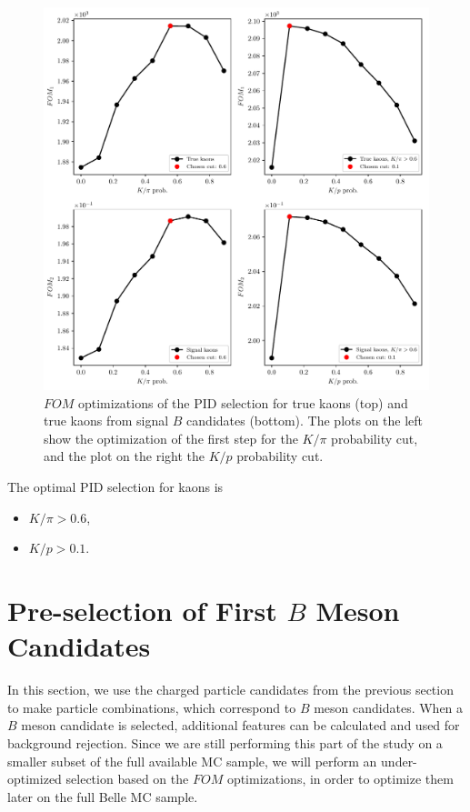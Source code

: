 \begin{figure}[H]
	\centering
	\captionsetup{width=.8\linewidth}
	\includegraphics[width=\linewidth]{fig/FSP_kaon_fom}
	\caption{$FOM$ optimizations of the PID selection for true kaons (top) and true kaons from signal $B$ candidates (bottom). The plots on the left show the optimization of the first step for the $K / \pi$ probability cut, and the plot on the right the $K/p$ probability cut.}
	\label{fig:Kfom}
\end{figure}

The optimal PID selection for kaons is
\begin{itemize}
	\item $K/\pi > 0.6$,
	\item $K/p > 0.1$.
\end{itemize}

\section{Pre-selection of First \texorpdfstring{$B$}{B} Meson Candidates}

In this section, we use the charged particle candidates from the previous section to make particle combinations, which correspond to $B$ meson candidates. When a $B$ meson candidate is selected, additional features can be calculated and used for background rejection. Since we are still performing this part of the study on a smaller subset of the full available MC sample, we will perform an under-optimized selection based on the $FOM$ optimizations, in order to optimize them later on the full Belle MC sample.

